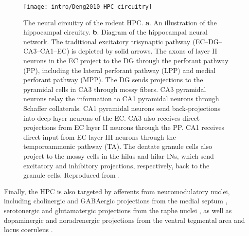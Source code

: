 \begin{figure}
	\centering
	\texttt{[image: intro/Deng2010\_HPC\_circuitry]}
	\caption[The neural circuitry of the rodent \acl{HPC}]{The neural circuitry of the rodent \acl{HPC}.
	\textbf{a}. An illustration of the hippocampal circuitry.
	\textbf{b}. Diagram of the hippocampal neural network. The traditional excitatory trisynaptic pathway (\ac{EC}--\ac{DG}--CA3--CA1--\ac{EC}) is depicted by solid arrows. The axons of layer II neurons in the \ac{EC} project to the \ac{DG} through the perforant pathway (PP), including the lateral perforant pathway (LPP) and medial perforant pathway (MPP). The \ac{DG} sends projections to the pyramidal cells in CA3 through mossy fibers. CA3 pyramidal neurons relay the information to CA1 pyramidal neurons through Schaffer collaterals. CA1 pyramidal neurons send back-projections into deep-layer neurons of the \ac{EC}. CA3 also receives direct projections from \ac{EC} layer II neurons through the PP. CA1 receives direct input from EC layer III neurons through the temporoammonic pathway (TA). The dentate granule cells also project to the mossy cells in the hilus and hilar \acp{IN}, which send excitatory and inhibitory projections, respectively, back to the granule cells.
	Reproduced from \citet{Deng2010}.}
	\label{fig:intro:memory:HPC_circuitry}
\end{figure}

Finally, the \ac{HPC} is also targeted by afferents from neuromodulatory nuclei, including cholinergic and GABAergic projections from the medial septum  \citep{Klausberger2008}, serotonergic and glutamatergic projections from the raphe nuclei \citep{Varga2009}, as well as dopaminergic and noradrenergic projections from the ventral tegmental area \citep{Gasbarri1997} and locus coeruleus \citep{Foote1983}.

